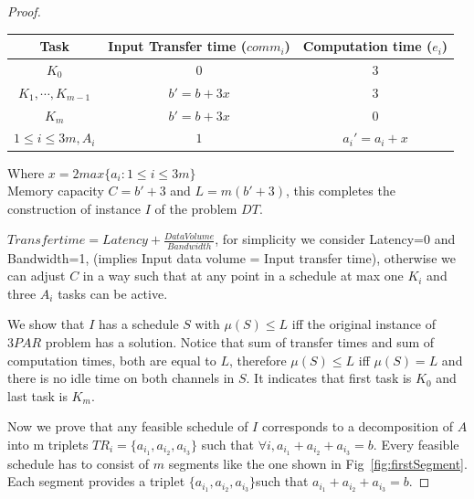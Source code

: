 \documentclass[runningheads]{llncs} %
\begin{document}
\begin{proof}
   		\begin{table}[htb]
   			\begin{tabular}{ |c|c|c| }
   				\hline
   				Task & Input Transfer time ($comm_i$)& Computation time ($e_i$)\\ \hline
   				$K_0$ & $0$ & $3$ \\ \hline
   				$K_1, \cdots, K_{m-1}$ & $b'=b+3x$ & $3$\\ \hline
   				$K_m$ & $b'=b+3x$ & $0$ \\ \hline
   				$1\le i \le 3m, A_i$ & $1$ & $a_i' = a_i +x$\\ \hline
   			\end{tabular}
   		\end{table}
   	Where $x= 2 max\{a_i:1\le i\le 3m\}$\\ 
   	Memory capacity $C=b'+3$ and $L=m(b'+3)$, this completes the construction of instance $I$ of the 
   	problem $DT$.
   	
   	$Transfer time = Latency + \frac{Data Volume}{Bandwidth}$, for simplicity we consider Latency=0 
   	and Bandwidth=1, (implies Input data volume = Input transfer time), otherwise we can adjust $C$ in 
   	a way such that at any point in a schedule at max one $K_i$ and three $A_i$ tasks can be active.
   	
   	
   	We show that $I$ has a schedule $S$ with $\mu(S) \le L$ iff the original instance of $3PAR$ 
   	problem  has a solution. Notice that sum of transfer times and sum of computation times, both are 
   	equal to $L$, therefore $\mu(S) \le L$ iff $\mu(S)=L$  and there is no idle time on both channels in 
   	$S$. It indicates that first task is $K_0$ and last task is $K_m$.
   	
   
   	Now we prove that any feasible schedule of $I$ corresponds to a decomposition of $A$ into m 
   	triplets $TR_i = \{a_{i_1}, a_{i_2}, a_{i_3}\}$ such that $\forall i, a_{i_1} + a_{i_2}  + a_{i_3}  = b$. Every 
   	feasible schedule has to consist of $m$ segments like the one shown in Fig~\ref{fig:firstSegment}. Each segment provides a triplet  $\{a_{i_1}, a_{i_2}, a_{i_3}\} $such that  $a_{i_1} + a_{i_2}  + a_{i_3}  = b$.
   	

\end{proof}
\end{document}
